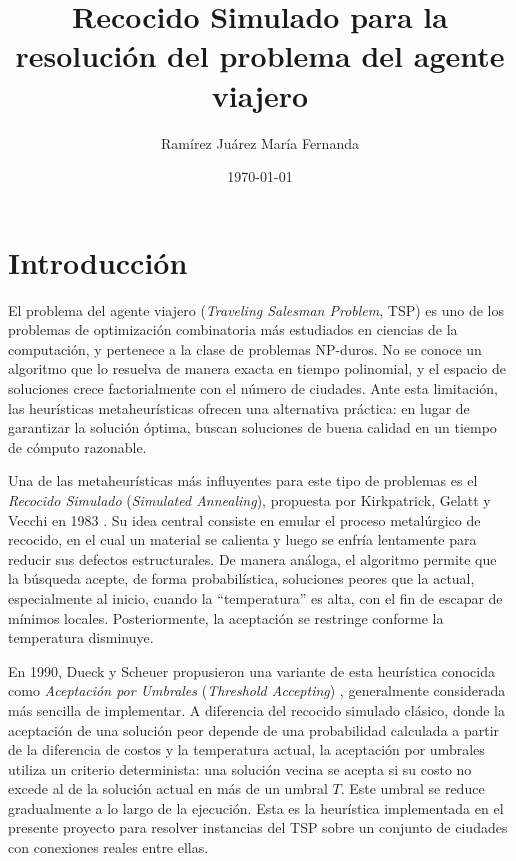 \documentclass[12pt,a4paper]{article}
\title{\textbf{Recocido Simulado para la resolución del problema del agente viajero}}
\author{Ramírez Juárez María Fernanda}
\date{\today}
\begin{document}
\maketitle

\section{Introducción}
\label{sec:introduccion}

El problema del agente viajero (\textit{Traveling Salesman Problem}, TSP) es uno de los problemas de optimización combinatoria más estudiados en ciencias de la computación, y pertenece a la clase de problemas NP-duros. No se conoce un algoritmo que lo resuelva de manera exacta en tiempo polinomial, y el espacio de soluciones crece factorialmente con el número de ciudades. Ante esta limitación, las heurísticas metaheurísticas ofrecen una alternativa práctica: en lugar de garantizar la solución óptima, buscan soluciones de buena calidad en un tiempo de cómputo razonable.

Una de las metaheurísticas más influyentes para este tipo de problemas es el \textit{Recocido Simulado} (\textit{Simulated Annealing}), propuesta por Kirkpatrick, Gelatt y Vecchi en 1983 \cite{kirkpatrick1983}. Su idea central consiste en emular el proceso metalúrgico de recocido, en el cual un material se calienta y luego se enfría lentamente para reducir sus defectos estructurales. De manera análoga, el algoritmo permite que la búsqueda acepte, de forma probabilística, soluciones peores que la actual, especialmente al inicio, cuando la ``temperatura'' es alta, con el fin de escapar de mínimos locales. Posteriormente, la aceptación se restringe conforme la temperatura disminuye.

En 1990, Dueck y Scheuer propusieron una variante de esta heurística conocida como \textit{Aceptación por Umbrales} (\textit{Threshold Accepting}) \cite{dueck1990}, generalmente considerada más sencilla de implementar. A diferencia del recocido simulado clásico, donde la aceptación de una solución peor depende de una probabilidad calculada a partir de la diferencia de costos y la temperatura actual, la aceptación por umbrales utiliza un criterio determinista: una solución vecina se acepta si su costo no excede al de la solución actual en más de un umbral $T$. Este umbral se reduce gradualmente a lo largo de la ejecución. Esta es la heurística implementada en el presente proyecto para resolver instancias del TSP sobre un conjunto de ciudades con conexiones reales entre ellas.
\end{document}
